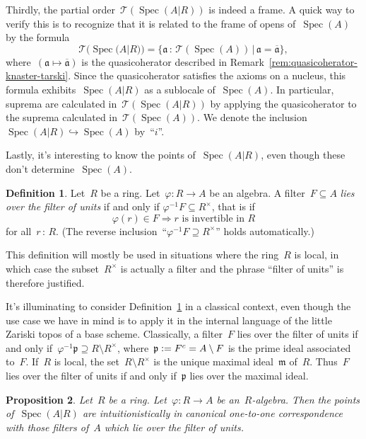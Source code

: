 \documentclass[10pt,reqno,a4paper]{amsbook}
\theoremstyle{definition}
\newtheorem{defn}{Definition}[section]
\theoremstyle{plain}
\newtheorem{prop}[defn]{Proposition}
\theoremstyle{remark}
\newcommand{\T}{\mathcal{T}}
\newcommand{\aaa}{\mathfrak{a}}
\newcommand{\ppp}{\mathfrak{p}}
\newcommand{\mmm}{\mathfrak{m}}
\DeclareMathOperator{\Spec}{Spec}
\newcommand{\Open}{\T}
\newcommand{\?}{\,{:}\,}
\renewcommand{\_}{\mathpunct{.}\,}
\newcommand{\defeq}{\vcentcolon=}
\begin{document}
Thirdly, the partial order~$\Open(\Spec(A|R))$ is indeed a frame. A quick
way to verify this is to recognize that it is related to the frame of opens
of~$\Spec(A)$ by the formula
\[ \Open(\Spec(A|R)) =
  \{ \aaa \? \Open(\Spec(A)) \,|\, \aaa = \overline{\aaa} \}, \]
where~$(\aaa \mapsto \overline{\aaa})$ is the quasicoherator described in
Remark~\ref{rem:quasicoherator-knaster-tarski}. Since the quasicoherator
satisfies the axioms on a nucleus, this formula exhibits~$\Spec(A|R)$ as a
sublocale of~$\Spec(A)$. In particular, suprema are calculated
in~$\Open(\Spec(A|R))$ by applying the quasicoherator to the suprema calculated
in~$\Open(\Spec(A))$. We denote the inclusion~$\Spec(A|R) \hookrightarrow
\Spec(A)$ by~``$i$''.

Lastly, it's interesting to know the points of~$\Spec(A|R)$, even though these
don't determine~$\Spec(A)$.

\begin{defn}\label{defn:over-the-filter-of-units}
Let~$R$ be a ring. Let~$\varphi : R \to A$ be an algebra. A
filter~$F \subseteq A$ \emph{lies over the filter of units} if and only if
$\varphi^{-1}F \subseteq R^\times$, that is if
\[ \varphi(r) \in F \Longrightarrow \text{$r$ is invertible in $R$} \]
for all~$r \? R$. (The reverse inclusion~``$\varphi^{-1}F \supseteq R^\times$''
holds automatically.)\end{defn}

This definition will mostly be used in situations where the ring~$R$ is local,
in which case the subset~$R^\times$ is actually a filter and the phrase
``filter of units'' is therefore justified.

It's illuminating to consider Definition~\ref{defn:over-the-filter-of-units} in
a classical context, even though the use case we have in mind is to apply it in
the internal language of the little Zariski topos of a base scheme.
Classically, a filter~$F$ lies over the filter of units if and only
if~$\varphi^{-1}\ppp \supseteq R \setminus R^\times$, where~$\ppp \defeq
F^c = A \setminus F$ is the prime ideal associated to~$F$. If~$R$ is local, the
set~$R \setminus R^\times$ is the unique maximal ideal~$\mmm$ of~$R$. Thus~$F$
lies over the filter of units if and only if~$\ppp$ lies over the maximal
ideal.

\begin{prop}Let~$R$ be a ring. Let~$\varphi : R \to A$ be an~$R$-algebra. Then
the points of~$\Spec(A|R)$ are intuitionistically in canonical one-to-one
correspondence with those filters of~$A$ which lie over the filter of units.
\end{prop}
\end{document}
